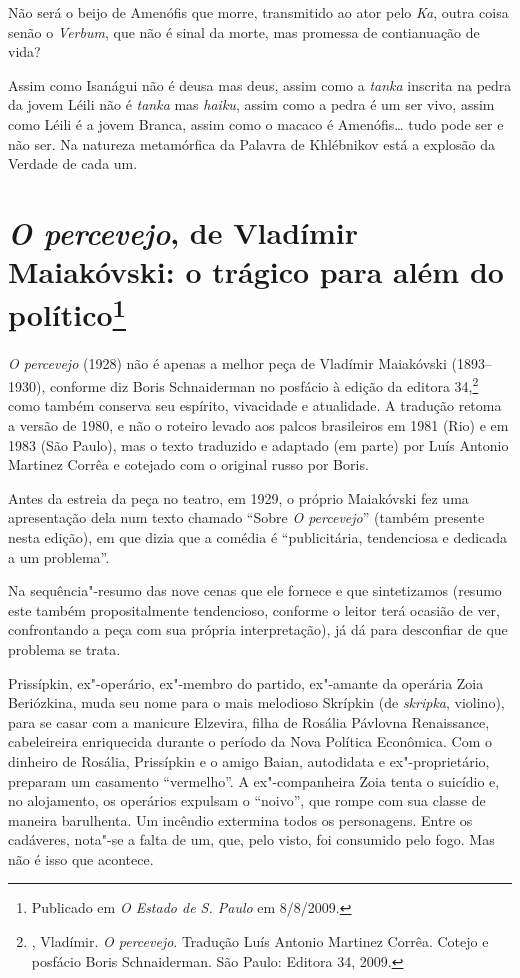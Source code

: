 {Não será o beijo de Amenófis que morre, transmitido ao ator pelo
\emph{Ka}, outra coisa senão o \emph{Verbum}, que não é sinal da morte,
mas promessa de contianuação de vida?

Assim como Isanágui não é deusa mas deus, assim como a \emph{tanka}
inscrita na pedra da jovem Léili não é \emph{tanka} mas \emph{haiku},
assim como a pedra é um ser vivo, assim como Léili é a jovem Branca,
assim como o macaco é Amenófis\ldots{} tudo pode ser e não ser. Na natureza
metamórfica da Palavra de Khlébnikov está a explosão da Verdade de cada
um.

\chapter{\emph{O percevejo}, de Vladímir Maiakóvski: o trágico para além
do político\footnote{Publicado em \emph{O Estado de S. Paulo} em
  8/8/2009.}}

\emph{O percevejo} (1928) não é apenas a melhor peça de Vladímir
Maiakóvski (1893--1930), conforme diz Boris Schnaiderman no posfácio à
edição da editora 34,\footnote{, Vladímir. \emph{O percevejo}.
  Tradução Luís Antonio Martinez Corrêa. Cotejo e posfácio Boris
  Schnaiderman. São Paulo: Editora 34, 2009.} como também conserva seu
espírito, vivacidade e atualidade. A tradução retoma a versão de 1980, e
não o roteiro levado aos palcos brasileiros em 1981 (Rio) e em 1983 (São
Paulo), mas o texto traduzido e adaptado (em parte) por Luís Antonio
Martinez Corrêa e cotejado com o original russo por Boris.

Antes da estreia da peça no teatro, em 1929, o próprio Maiakóvski fez
uma apresentação dela num texto chamado ``Sobre \emph{O percevejo}''
(também presente nesta edição), em que dizia que a comédia é
``publicitária, tendenciosa e dedicada a um problema''.

Na sequência"-resumo das nove cenas que ele fornece e que sintetizamos
(resumo este também propositalmente tendencioso, conforme o leitor terá
ocasião de ver, confrontando a peça com sua própria interpretação), já
dá para desconfiar de que problema se trata.

Prissípkin, ex"-operário, ex"-membro do partido, ex"-amante da operária
Zoia Beriózkina, muda seu nome para o mais melodioso Skrípkin (de
\emph{skripka}, violino), para se casar com a manicure Elzevira, filha
de Rosália Pávlovna Renaissance, cabeleireira enriquecida durante o
período da Nova Política Econômica. Com o dinheiro de Rosália,
Prissípkin e o amigo Baian, autodidata e ex"-proprietário, preparam um
casamento ``vermelho''. A ex"-companheira Zoia tenta o suicídio e, no
alojamento, os operários expulsam o ``noivo'', que rompe com sua classe de
maneira barulhenta. Um incêndio extermina todos os personagens. Entre os
cadáveres, nota"-se a falta de um, que, pelo visto, foi consumido pelo
fogo. Mas não é isso que acontece.

}

